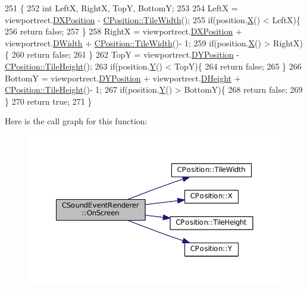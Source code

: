 \begin{DoxyCode}
251                                                                                            \{
252     \textcolor{keywordtype}{int} LeftX, RightX, TopY, BottomY;
253     
254     LeftX = viewportrect.\hyperlink{structSRectangle_abcbddb03b3ee416cc33109833b5f075c}{DXPosition} - \hyperlink{classCPosition_a27a7a8b9a5541da0aa8d97d785650fb8}{CPosition::TileWidth}();
255     \textcolor{keywordflow}{if}(position.\hyperlink{classCPosition_a9a6b94d3b91df1492d166d9964c865fc}{X}() < LeftX)\{
256         \textcolor{keywordflow}{return} \textcolor{keyword}{false};    
257     \}
258     RightX = viewportrect.\hyperlink{structSRectangle_abcbddb03b3ee416cc33109833b5f075c}{DXPosition} + viewportrect.\hyperlink{structSRectangle_a4150898b3f7d90f6e4b0d44bf1ae3bd2}{DWidth} + 
      \hyperlink{classCPosition_a27a7a8b9a5541da0aa8d97d785650fb8}{CPosition::TileWidth}()- 1;
259     \textcolor{keywordflow}{if}(position.\hyperlink{classCPosition_a9a6b94d3b91df1492d166d9964c865fc}{X}() > RightX)\{
260         \textcolor{keywordflow}{return} \textcolor{keyword}{false};    
261     \}
262     TopY = viewportrect.\hyperlink{structSRectangle_a120aa0a90033bc6e07c36c151a3bbc71}{DYPosition} - \hyperlink{classCPosition_ac4f0edd9c9632f1bdca981ef5d9b71e5}{CPosition::TileHeight}();
263     \textcolor{keywordflow}{if}(position.\hyperlink{classCPosition_a1aa8a30e2f08dda1f797736ba8c13a87}{Y}() < TopY)\{
264         \textcolor{keywordflow}{return} \textcolor{keyword}{false};    
265     \}
266     BottomY = viewportrect.\hyperlink{structSRectangle_a120aa0a90033bc6e07c36c151a3bbc71}{DYPosition} + viewportrect.\hyperlink{structSRectangle_a84ea3c2314c43cab6186170662188899}{DHeight} + 
      \hyperlink{classCPosition_ac4f0edd9c9632f1bdca981ef5d9b71e5}{CPosition::TileHeight}()- 1;
267     \textcolor{keywordflow}{if}(position.\hyperlink{classCPosition_a1aa8a30e2f08dda1f797736ba8c13a87}{Y}() > BottomY)\{
268         \textcolor{keywordflow}{return} \textcolor{keyword}{false};    
269     \}
270     \textcolor{keywordflow}{return} \textcolor{keyword}{true};
271 \}
\end{DoxyCode}
Here is the call graph for this function\+:
\nopagebreak
\begin{figure}[H]
\begin{center}
\leavevmode
\includegraphics[width=350pt]{classCSoundEventRenderer_a9df97d476a3a39cb7126db9c366c2f0c_cgraph}
\end{center}
\end{figure}
